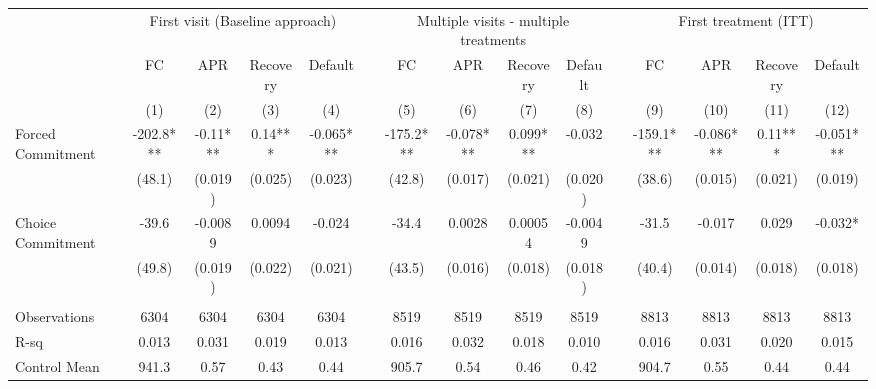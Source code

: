 \begin{tabular}{lcccccccccccccc}
\toprule
      & \multicolumn{4}{c}{First visit (Baseline approach)} &       & \multicolumn{4}{c}{Multiple visits - multiple treatments} &       & \multicolumn{4}{c}{First treatment (ITT)} \\
\cmidrule{7-10}\cmidrule{12-15}      & FC    & APR   & Recovery & Default &       & FC    & APR   & Recovery & Default &       & FC    & APR   & Recovery & Default \\
\midrule
      & (1)   & (2)   & (3)   & (4)   &       & (5)   & (6)   & (7)   & (8)   &       & (9)   & (10)  & (11)  & (12) \\
\midrule
\midrule
Forced Commitment & -202.8*** & -0.11*** & 0.14*** & -0.065*** &       & -175.2*** & -0.078*** & 0.099*** & -0.032 &       & -159.1*** & -0.086*** & 0.11*** & -0.051*** \\
      & (48.1) & (0.019) & (0.025) & (0.023) &       & (42.8) & (0.017) & (0.021) & (0.020) &       & (38.6) & (0.015) & (0.021) & (0.019) \\
Choice Commitment & -39.6 & -0.0089 & 0.0094 & -0.024 &       & -34.4 & 0.0028 & 0.00054 & -0.0049 &       & -31.5 & -0.017 & 0.029 & -0.032* \\
      & (49.8) & (0.019) & (0.022) & (0.021) &       & (43.5) & (0.016) & (0.018) & (0.018) &       & (40.4) & (0.014) & (0.018) & (0.018) \\
      &       &       &       &       &       &       &       &       &       &       &       &       &       &  \\
\midrule
Observations & 6304  & 6304  & 6304  & 6304  &       & 8519  & 8519  & 8519  & 8519  &       & 8813  & 8813  & 8813  & 8813 \\
R-sq  & 0.013 & 0.031 & 0.019 & 0.013 &       & 0.016 & 0.032 & 0.018 & 0.010 &       & 0.016 & 0.031 & 0.020 & 0.015 \\
Control Mean & 941.3 & 0.57  & 0.43  & 0.44  &       & 905.7 & 0.54  & 0.46  & 0.42  &       & 904.7 & 0.55  & 0.44  & 0.44 \\
\bottomrule
\bottomrule
\end{tabular}%

